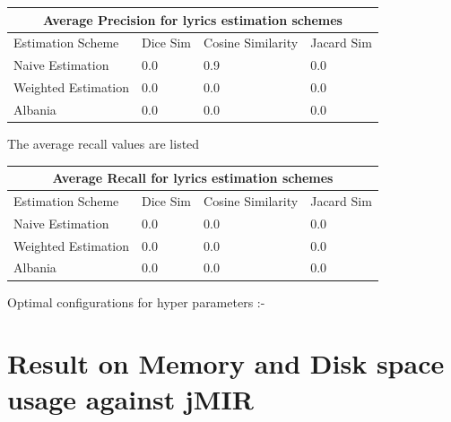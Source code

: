 \begin{tabular}{ |p{4cm}||p{3cm}|p{3cm}|p{3cm}|  }
 \hline
 \multicolumn{4}{|c|}{Average Precision for lyrics estimation schemes} \\
 \hline
 Estimation Scheme & Dice Sim & Cosine Similarity & Jacard Sim\\
 \hline
 Naive Estimation   & 0.0    & 0.9 &   0.0\\
 Weighted Estimation & 0.0  & 0.0 & 0.0\\
 Albania &0.0 & 0.0 &  0.0\\
 \hline 
\end{tabular}

The average recall values are listed \\ 

\begin{tabular}{ |p{4cm}||p{3cm}|p{3cm}|p{3cm}|  }
 \hline
 \multicolumn{4}{|c|}{Average Recall for lyrics estimation schemes} \\
 \hline
 Estimation Scheme & Dice Sim & Cosine Similarity & Jacard Sim\\
 \hline
 Naive Estimation   & 0.0    & 0.0&   0.0\\
 Weighted Estimation &   0.0  & 0.0   & 0.0\\
 Albania & 0.0 & 0.0 &  0.0\\
 \hline 
\end{tabular}

Optimal configurations for hyper parameters :-

\section{Result on Memory and Disk space usage against jMIR}

